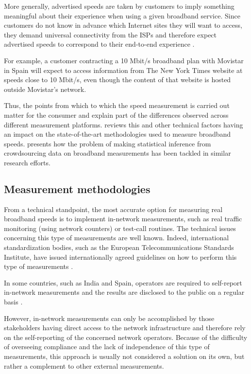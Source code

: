 \documentclass[12pt]{article}
\begin{document}
More generally, advertised speeds are taken by customers to imply something meaningful about their experience when using a given broadband service. Since customers do not know in advance which Internet sites they will want to access, they demand universal connectivity from the ISPs and therefore expect advertised speeds to correspond to their end-to-end experience \citep[see the discussion on the MCI merger in][pp. 508-511]{economides2008}. 

For example, a customer contracting a 10 Mbit/s broadband plan with Movistar in Spain will expect to access information from The New York Times website at speeds close to 10 Mbit/s, even though the content of that website is hosted outside Movistar's network.      

Thus, the points from which to which the speed measurement is carried out matter for the consumer and explain part of the differences observed across different measurement platforms.  reviews this and other technical factors having an impact on the state-of-the-art methodologies used to measure broadband speeds.  presents how the problem of making statistical inference from crowdsourcing data on broadband measurements has been tackled in similar research efforts.   

\subsection{Measurement methodologies} \label{meth}

From a technical standpoint, the most accurate option for measuring real broadband speeds is to implement in-network measurements, such as real traffic monitoring (using network counters) or test-call routines. The technical issues concerning this type of measurements are well known. Indeed,  international standardization bodies, such as the European Telecommunications Standards Institute, have issued internationally agreed guidelines on how to perform this type of measurements \citep{etsi}.

In some countries, such as India and Spain, operators are required to self-report in-network measurements and the results are disclosed to the public on a regular basis \citep{setsi,zuhyle2015}.

However, in-network measurements can only be accomplished by those stakeholders having direct access to the network infrastructure and therefore rely on the self-reporting of the concerned network operators. Because of the difficulty of overseeing compliance and the lack of independence of this type of measurements, this approach is usually not considered a solution on its own, but rather a complement to other external measurements.
\end{document}
